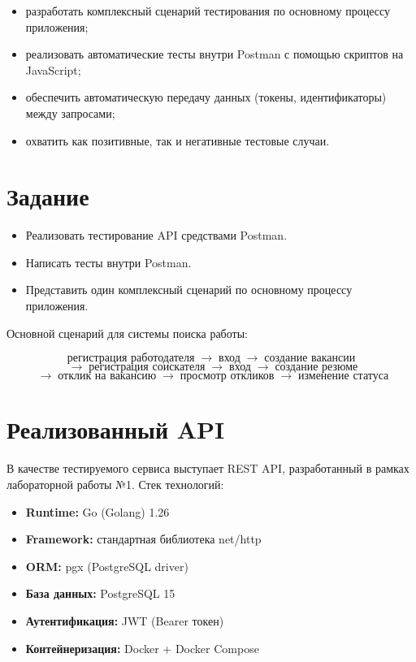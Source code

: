 ﻿\documentclass[a4paper,14pt]{extarticle}
\begin{document}
\begin{itemize}[leftmargin=2cm]
  \item разработать комплексный сценарий тестирования по основному процессу приложения;
  \item реализовать автоматические тесты внутри Postman с помощью скриптов на JavaScript;
  \item обеспечить автоматическую передачу данных (токены, идентификаторы) между запросами;
  \item охватить как позитивные, так и негативные тестовые случаи.
\end{itemize}

\section{Задание}

\begin{itemize}[leftmargin=2cm]
  \item Реализовать тестирование API средствами Postman.
  \item Написать тесты внутри Postman.
  \item Представить один комплексный сценарий по основному процессу приложения.
\end{itemize}

Основной сценарий для системы поиска работы:

\[
\textit{регистрация работодателя} \;\to\; \textit{вход} \;\to\; \textit{создание вакансии}
\]
\[
\;\to\; \textit{регистрация соискателя} \;\to\; \textit{вход} \;\to\; \textit{создание резюме}
\]
\[
\;\to\; \textit{отклик на вакансию} \;\to\; \textit{просмотр откликов} \;\to\; \textit{изменение статуса}
\]

\section{Реализованный API}

В качестве тестируемого сервиса выступает REST API, разработанный в рамках лабораторной работы №1. Стек технологий:

\begin{itemize}[leftmargin=2cm]
  \item \textbf{Runtime:} Go (Golang) 1.26
  \item \textbf{Framework:} стандартная библиотека net/http
  \item \textbf{ORM:} pgx (PostgreSQL driver)
  \item \textbf{База данных:} PostgreSQL 15
  \item \textbf{Аутентификация:} JWT (Bearer токен)
  \item \textbf{Контейнеризация:} Docker + Docker Compose
\end{itemize}
\end{document}
